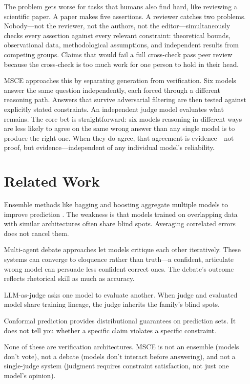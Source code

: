 \documentclass[11pt,a4paper]{article}
\begin{document}
The problem gets worse for tasks that humans also find hard, like reviewing a scientific paper. A paper makes five assertions. A reviewer catches two problems. Nobody---not the reviewer, not the authors, not the editor---simultaneously checks every assertion against every relevant constraint: theoretical bounds, observational data, methodological assumptions, and independent results from competing groups. Claims that would fail a full cross-check pass peer review because the cross-check is too much work for one person to hold in their head.

MSCE approaches this by separating generation from verification. Six models answer the same question independently, each forced through a different reasoning path. Answers that survive adversarial filtering are then tested against explicitly stated constraints. An independent judge model evaluates what remains. The core bet is straightforward: six models reasoning in different ways are less likely to agree on the same wrong answer than any single model is to produce the right one. When they do agree, that agreement is evidence---not proof, but evidence---independent of any individual model's reliability.

\section{Related Work}

Ensemble methods like bagging and boosting aggregate multiple models to improve prediction \cite{dietterich2000,breiman2001}. The weakness is that models trained on overlapping data with similar architectures often share blind spots. Averaging correlated errors does not cancel them.

Multi-agent debate approaches \cite{du2024,michael2024} let models critique each other iteratively. These systems can converge to eloquence rather than truth---a confident, articulate wrong model can persuade less confident correct ones. The debate's outcome reflects rhetorical skill as much as accuracy.

LLM-as-judge \cite{zheng2023} asks one model to evaluate another. When judge and evaluated model share training lineage, the judge inherits the family's blind spots.

Conformal prediction \cite{angelopoulos2023} provides distributional guarantees on prediction sets. It does not tell you whether a specific claim violates a specific constraint.

None of these are verification architectures. MSCE is not an ensemble (models don't vote), not a debate (models don't interact before answering), and not a single-judge system (judgment requires constraint satisfaction, not just one model's opinion).
\end{document}
